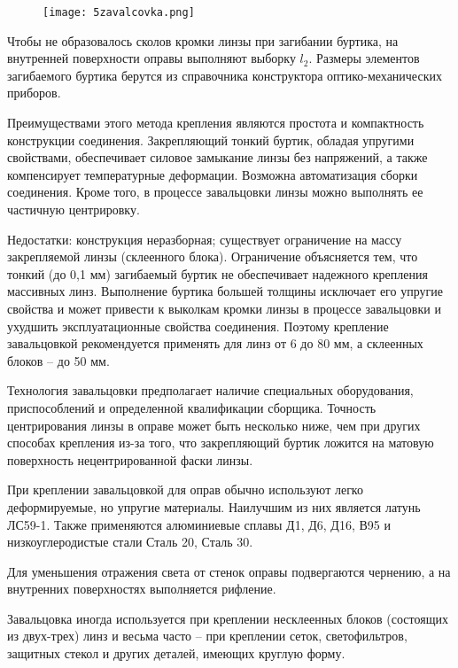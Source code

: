 \begin{figure}[h!]
	\texttt{[image: 5zavalcovka.png]}
	\label{pic:5zavalcovka}
\end{figure}

Чтобы не образовалось сколов кромки линзы при загибании буртика, на внутренней поверхности оправы выполняют выборку $ l_2 $. Размеры элементов загибаемого буртика берутся из справочника конструктора оптико-механических приборов. 

Преимуществами этого метода крепления являются простота и компактность конструкции соединения. Закрепляющий тонкий буртик, обладая упругими свойствами, обеспечивает силовое замыкание линзы без напряжений, а также компенсирует температурные деформации. Возможна автоматизация сборки соединения. Кроме того, в процессе завальцовки линзы можно выполнять ее частичную центрировку.

Недостатки: конструкция неразборная; существует ограничение на массу закрепляемой линзы (склеенного блока). Ограничение объясняется тем, что тонкий (до 0,1 мм) загибаемый буртик не обеспечивает надежного крепления массивных линз. Выполнение буртика большей толщины исключает его упругие свойства и может привести к выколкам кромки линзы в процессе завальцовки и ухудшить эксплуатационные свойства соединения. Поэтому крепление завальцовкой рекомендуется применять для линз от 6 до 80 мм, а склеенных блоков -- до 50 мм.

Технология завальцовки предполагает наличие специальных оборудования, приспособлений и определенной квалификации сборщика. Точность центрирования линзы в оправе может быть несколько ниже, чем при других способах крепления из-за того, что закрепляющий буртик ложится на матовую поверхность нецентрированной фаски линзы.

При креплении завальцовкой для оправ обычно используют легко деформируемые, но упругие материалы. Наилучшим из них является латунь ЛС59-1. Также применяются алюминиевые сплавы Д1, Д6, Д16, В95 и низкоуглеродистые стали Сталь 20, Сталь 30.

Для уменьшения отражения света от стенок оправы подвергаются чернению, а на внутренних поверхностях выполняется рифление.

Завальцовка иногда используется при креплении несклеенных блоков (состоящих из двух-трех) линз и весьма часто -- при креплении сеток, светофильтров, защитных стекол и других деталей, имеющих круглую форму.

